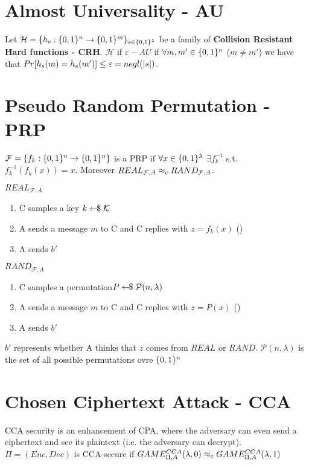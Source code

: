 \section{Almost Universality - AU}
Let $\mathcal{H} = \{ h_s : \{0,1\}^n \rightarrow \{0,1\}^m \}_{s \in \{0,1\}^\lambda}$ be a family of \textbf{Collision Resistant Hard functions - CRH}.\newline
$\mathcal{H}$ if $\varepsilon-AU$ if $\forall m,m' \in \{0,1\}^n$ ($m \neq m'$) we have that $Pr[h_s (m) = h_s(m')] \leq \varepsilon = negl(\vert s \vert)$.

\newpage
\section{Pseudo Random Permutation - PRP}
$\mathcal{F} = \{ f_k : \{0,1\}^n \rightarrow \{0,1\}^n \}$ is a PRP if $\forall x \in \{0,1\}^\lambda$ $\exists f_k^{-1}$ s.t.\newline
$f_k^{-1} (f_k(x)) = x$.\newline
Moreover $REAL_{\mathcal{F},A} \approx_c RAND_{\mathcal{F},A}$.

\begin{multicols}{2}
    $REAL_{\mathcal{F},A}$
    \begin{enumerate}
        \item C samples a key $k \leftarrow\kern-0.42em{\$} \; \mathcal{K}$
        \item A sends a message $m$ to C and C replies with $z = f_k(x)$ (\poly)
        \item A sends $b'$
    \end{enumerate}

    \columnbreak

    $RAND_{\mathcal{F},A}$
    \begin{enumerate}
        \item C samples a permutation\newline $P \leftarrow\kern-0.42em{\$} \; \mathcal{P}(n,\lambda)$
        \item A sends a message $m$ to C and C replies with $z = P(x)$ (\poly)
        \item A sends $b'$
    \end{enumerate}
\end{multicols}
$b'$ represents whether A thinks that $z$ comes from $REAL$ or $RAND$.\newline
$\mathcal{P}(n,\lambda)$ is the set of all possible permutations ovre $\{0,1\}^n$


\section{Chosen Ciphertext Attack - CCA}
CCA security is an enhancement of CPA, where the adversary can even send a ciphertext and see its plaintext (i.e. the adversary can decrypt).
$\Pi = (Enc,Dec)$ is CCA-secure if $GAME_{\Pi, A}^{CCA} (\lambda,0) \approx_c GAME_{\Pi, A}^{CCA} (\lambda,1)$

